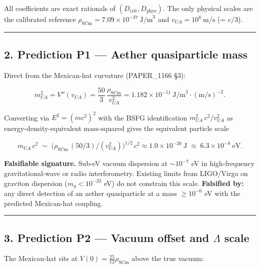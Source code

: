 \documentclass[
]{article}
\begin{document}
All coefficients are exact rationals of
\((D_{\mathrm{crit}}, D_{\mathrm{phys}})\). The only physical scales are
the calibrated reference \(\rho_{\mathrm{SCm}}=
7.09\times10^{-37}\ \text{J/m}^{3}\) and \(v_{UA}=10^{8}\ \text{m/s}\)
(= \(c/3\)).

\begin{center}\rule{0.5\linewidth}{0.5pt}\end{center}

\subsection{2. Prediction P1 --- Aether quasiparticle
mass}\label{prediction-p1-aether-quasiparticle-mass}

Direct from the Mexican-hat curvature (PAPER\_1166 §3):

\[
m_{UA}^{2} = V''(v_{UA}) = \frac{50}{3}\,\frac{\rho_{\mathrm{SCm}}}{v_{UA}^{2}}
= 1.182\times10^{-51}\ \text{J/m}^{3}\!\cdot\!(\text{m/s})^{-2}.
\]

Converting via \(E^{2} = (m c^{2})^{2}\) with the BSFG identification
\(m_{UA}^{2}\,c^{2}/v_{UA}^{2}\) as energy-density-equivalent
mass-squared gives the equivalent particle scale

\[
m_{UA}\,c^{2}\;\sim\;\bigl(\rho_{\mathrm{SCm}}\,(50/3)/(v_{UA}^{2})\bigr)^{1/2}\,c^{2}
\approx 1.0\times10^{-26}\ \text{J} \;\approx\; 6.3\times10^{-8}\ \text{eV}.
\]

\textbf{Falsifiable signature.} Sub-eV vacuum dispersion at
\(\sim 10^{-7}\) eV in high-frequency gravitational-wave or radio
interferometry. Existing limits from LIGO/Virgo on graviton dispersion
(\(m_g < 10^{-23}\) eV) do not constrain this scale. \textbf{Falsified
by:} any direct detection of an aether quasiparticle at a mass
\(\geq 10^{-6}\) eV with the predicted Mexican-hat coupling.

\begin{center}\rule{0.5\linewidth}{0.5pt}\end{center}

\subsection{\texorpdfstring{3. Prediction P2 --- Vacuum offset and
\(\Lambda\)
scale}{3. Prediction P2 --- Vacuum offset and \textbackslash Lambda scale}}\label{prediction-p2-vacuum-offset-and-lambda-scale}

The Mexican-hat sits at \(V(0) = \tfrac{25}{12}\rho_{\mathrm{SCm}}\)
above the true vacuum:
\end{document}
